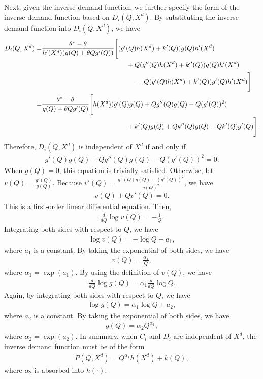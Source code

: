 \documentclass[11pt, a4paper]{article}
\theoremstyle{remark}
\begin{document}
Next, given the inverse demand function, we further specify the form of the inverse demand function based on $D_i(Q, X^{d})$.
By substituting the inverse demand function into $D_i(Q, X^{d})$, we have
\begin{align}
    D_i(Q, X^{d}) = &\frac{\theta^{*} - \theta}{h'(X^{d})(g(Q) + \theta Q g'(Q))}\Bigg[
    (g'(Q)h(X^{d}) + k'(Q) )g(Q)h'(X^{d})\\
    & \hspace{4.5cm} + Q(g''(Q)h(X^{d}) + k''(Q))g(Q)h'(X^{d}) \\
    &\hspace{5cm} - Q(g'(Q)h(X^{d}) + k'(Q))g'(Q)h'(X^{d})\Bigg]\\
    =&  \frac{\theta^{*} - \theta}{g(Q) + \theta Q g'(Q)}\Bigg[h(X^{d})(g'(Q)g(Q) + Qg{''}(Q)g(Q) - Q (g'(Q))^{2})\\
    & \hspace{4.5cm} + k'(Q)g(Q) + Qk''(Q)g(Q) - Qk'(Q)g'(Q)\Bigg].
\end{align}
Therefore, $D_i(Q, X^{d})$ is independent of $X^{d}$ if and only if
\begin{align}
    g'(Q)g(Q) + Qg{''}(Q)g(Q) - Q (g'(Q))^{2} = 0.
\end{align}
When $g(Q) = 0$, this equation is trivially satisfied.
Otherwise, let $v(Q) = \frac{g'(Q)}{g(Q)}$.
Because $v'(Q) = \frac{g''(Q)g(Q) - (g'(Q))^2}{g(Q)^2}$, we have
\begin{align}
    v(Q) + Qv'(Q) = 0.
\end{align}
This is a first-order linear differential equation.
Then, 
\begin{align}
    \frac{d }{d Q}\log v(Q) = -\frac{1}{Q}.
\end{align}
Integrating both sides with respect to $Q$, we have
\begin{align}
    \log v(Q) = -\log Q + a_1,
\end{align}
where $a_1$ is a constant.
By taking the exponential of both sides, we have
\begin{align}
    v(Q) = \frac{\alpha_1}{Q}, 
\end{align}
where $\alpha_1 = \exp(a_1)$.
By using the definition of $v(Q)$, we have
\begin{align}
    \frac{d }{d Q}\log g(Q) = \alpha_1\frac{d}{dQ}\log Q.
\end{align}
Again, by integrating both sides with respect to $Q$, we have
\begin{align}
    \log g(Q) = \alpha_1\log Q + a_2,
\end{align}
where $a_2$ is a constant.
By taking the exponential of both sides, we have
\begin{align}
    g(Q) = \alpha_2Q^{\alpha_1},
\end{align}
where $\alpha_2 = \exp(a_2)$.
In summary, when $C_i$ and $D_i$ are independent of $X^{d}$, the inverse demand function must be of the form
\begin{align}
    P(Q, X^{d}) = Q^{\alpha_1}h(X^{d}) + k(Q),
\end{align}
where $\alpha_2$ is absorbed into $h(\cdot)$.
\end{document}
